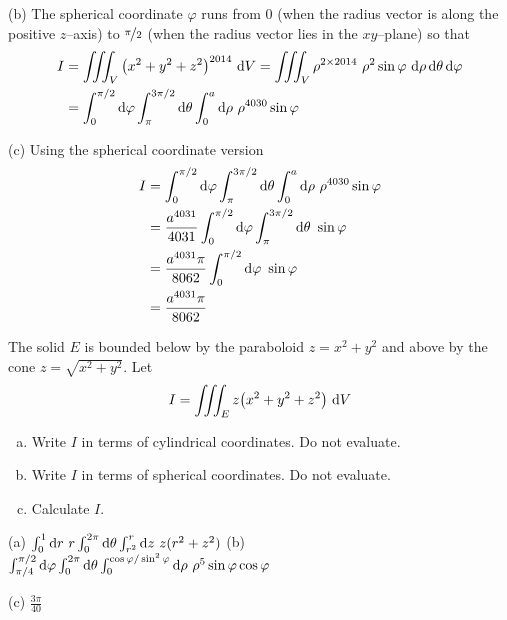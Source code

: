 \begin{solution}
(b) The spherical coordinate $\varphi$ runs from $0$ (when the radius
vector is along the positive $z$--axis)  to $\nicefrac{\pi}{2}$
(when the radius vector lies in the $xy$--plane) so that
\begin{align*}
I&= \tripInt_V \big(x^2+y^2+z^2\big)^{2014}\ \dee{V}
  = \tripInt_V \rho^{2\times 2014}\ \rho^2\sin\varphi\ 
                 \dee{\rho}\,\dee{\theta}\,\dee{\varphi} \\
&=\int_0^{\pi/2} \dee{\varphi}\int_{\pi}^{3\pi/2}\dee{\theta} 
     \int_0^a\dee{\rho}\ \rho^{4030}\sin\varphi
\end{align*}

(c) Using the spherical coordinate version
\begin{align*}
I&=\int_0^{\pi/2} \mathrm{d}\varphi\int_{\pi}^{3\pi/2}\mathrm{d}\theta 
     \int_0^a\mathrm{d}\rho\ \rho^{4030}\sin\varphi \\
 &=\frac{a^{4031}}{4031}
      \int_0^{\pi/2} \mathrm{d}\varphi\int_{\pi}^{3\pi/2}\mathrm{d}\theta 
          \ \sin\varphi \\
 &=\frac{a^{4031}\pi}{8062}
      \int_0^{\pi/2} \mathrm{d}\varphi\ \sin\varphi \\
 &=\frac{a^{4031}\pi}{8062}
\end{align*}
\end{solution}

\begin{question}[M200 2015D] %
The solid $E$ is bounded below by the paraboloid $z = x^2 + y^2$ 
and above by the cone $z=\sqrt{x^2+y^2}$. Let
\begin{equation*}
I = \tripInt_E z\big(x^2+y^2+z^2\big)\ \dee{V}
\end{equation*}
\begin{enumerate}[(a)]
\item
Write $I$ in terms of cylindrical coordinates. Do not evaluate.
\item
Write $I$ in terms of spherical coordinates. Do not evaluate.
\item
Calculate $I$.
\end{enumerate}
\end{question}

%

\begin{answer}
(a) $\int_0^1 \mathrm{d}r\ r \int_0^{2\pi}\mathrm{d}\theta \int_{r^2}^r\mathrm{d}z\
           z(r^2+z^2)$\qquad
(b) $\int_{\pi/4}^{\pi/2} \dee{\varphi} \int_0^{2\pi}\dee{\theta}
         \int_0^{\cos\varphi/\sin^2\varphi} \dee{\rho}\ \rho^5\sin\varphi 
             \cos\varphi$

(c) $\frac{3\pi}{40}$
\end{answer}

